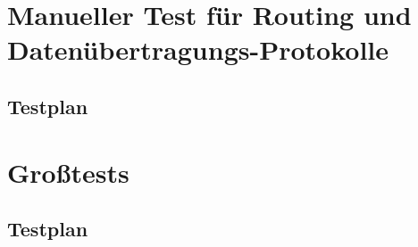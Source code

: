 


\clearpage
\section{Manueller Test für Routing und Datenübertragungs-Protokolle}
\subsection{Testplan}




\section{Großtests}
\subsection{Testplan}



